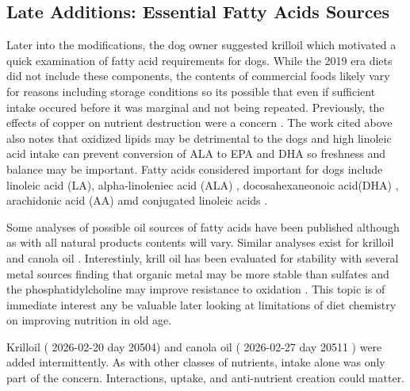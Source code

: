 \subsection{Late Additions: Essential Fatty Acids Sources }
Later into the modifications, the dog owner suggested krilloil
which motivated a quick examination of fatty acid requirements
for dogs. 
While the 2019 era diets did not include these components,
the contents of commercial foods likely vary for reasons
including storage conditions
\cite{Kara_Effect_stocking_conditions_2021}
so its possible that even if sufficient intake occured before
it was marginal and not being repeated.  
Previously, the effects of copper on nutrient destruction  
were  a concern \cite{marchywka-MJM-2024-010-0.01rg}.
The  work  cited above
\cite{Kara_Effect_stocking_conditions_2021}
also notes
that oxidized lipids may be detrimental to the dogs and 
high linoleic acid intake can prevent conversion of ALA to EPA and DHA
so freshness and balance may be important.
Fatty acids considered important for dogs include
linoleic acid (LA), alpha-linoleniec acid (ALA) ,
docosahexaneonoic acid(DHA) , arachidonic acid (AA) 
amd conjugated linoleic acids \cite{Bauer_Essential_fatty_acid_metabolism_2008}.


Some analyses of possible oil sources of fatty acids have been published
\cite{Ojha_Poudel_Rokaya_Chemical_Compositions_Essential_2024}
although as with all natural products contents will vary.
 Similar analyses exist for krilloil
\cite{Fuller_Cumming_Card_Free_Fatty_Acids_2020}
and canola oil
\cite{Lewinska_Zebrowski_Duda_Fatty_Acid_Profile_2015}.
Interestinly, krill oil has been evaluated for stability
with several metal sources finding that organic metal
may be more stable than sulfates and the phosphatidylcholine
may improve resistance  to oxidation \cite{WANG2020127448}.
This topic is of immediate interest any be valuable later
looking at limitations of diet chemistry on improving
nutrition in old age. 


Krilloil ( 2026-02-20 day 20504)  and canola oil ( 2026-02-27 day 20511 )
 were added intermittently. As with other classes of nutrients,
intake alone was only part of the concern. Interactions, 
uptake, and anti-nutrient creation could matter.  


